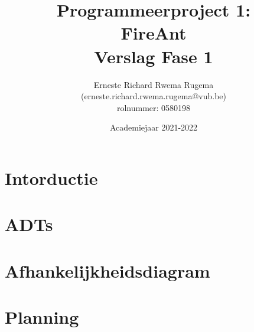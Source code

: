\documentclass[11pt]{report}
\title{{Programmeerproject 1:}\\
				{FireAnt}\\
				{\large Verslag Fase 1}}
\author{{Erneste Richard Rwema Rugema}\\
    {(erneste.richard.rwema.rugema@vub.be)}\\
			{\leftmark rolnummer: 0580198}}
\date{Academiejaar 2021-2022}
\begin{document}
\maketitle

\tableofcontents
\newpage

\chapter{Intorductie}


\chapter{ADTs}


\chapter{Afhankelijkheidsdiagram}


\chapter{Planning}

\end{document}
